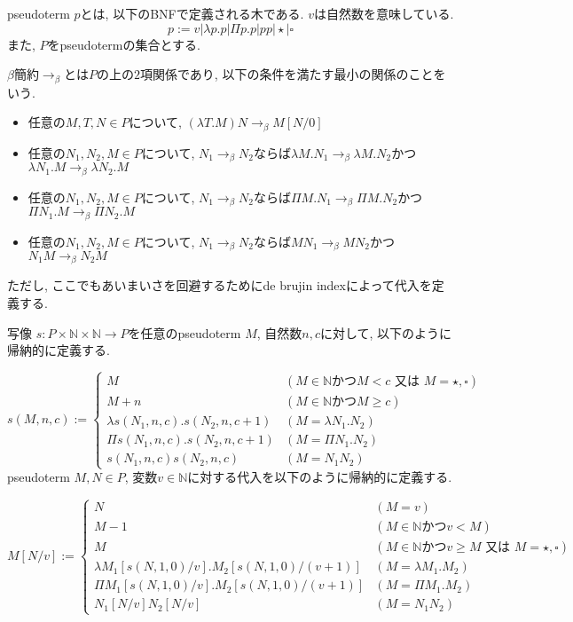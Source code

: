 \documentclass{ltjsarticle}
\begin{document}
\begin{defn}
 pseudoterm $p$とは, 以下のBNFで定義される木である. $v$は自然数を意味している.
 \[
 p := v | \lambda p. p | \Pi p. p | p p | \star | \square
 \]
 また, $P$をpseudotermの集合とする.
\end{defn}

\begin{defn}
 $\beta$簡約$\rightarrow_{\beta}$とは$P$の上の$2$項関係であり, 以下の条件を満たす最小の関係のことをいう.
 \begin{itemize}
  \item 任意の$M, T, N \in P$について, $(\lambda T. M) N \rightarrow_\beta M[N/0]$
  \item 任意の$N_1, N_2, M \in P$について, $N_1 \rightarrow_\beta N_2$ならば$\lambda M. N_1 \rightarrow_\beta \lambda M. N_2$かつ$\lambda N_1. M \rightarrow_\beta \lambda N_2. M$
  \item 任意の$N_1, N_2, M \in P$について, $N_1 \rightarrow_\beta N_2$ならば$\Pi M. N_1 \rightarrow_\beta \Pi M. N_2$かつ$\Pi N_1. M \rightarrow_\beta \Pi N_2. M$
  \item 任意の$N_1, N_2, M \in P$について, $N_1 \rightarrow_\beta N_2$ならば$M N_1 \rightarrow_\beta M N_2$かつ$N_1 M \rightarrow_\beta N_2 M$
 \end{itemize}
\end{defn}

 ただし, ここでもあいまいさを回避するためにde brujin indexによって代入を定義する.

\begin{defn}
 写像 $s \colon P \times \mathbb{N} \times \mathbb{N} \rightarrow P$を任意のpseudoterm $M$, 自然数$n, c$に対して, 以下のように帰納的に定義する.

\[
  s (M, n, c) := \begin{cases}
    M & (M \in \mathbb{N} \text{かつ} M < c \text{ 又は } M = \star, \square) \\
    M + n & (M \in \mathbb{N} \text{かつ} M \geq c) \\
    \lambda s (N_1, n, c). s (N_2, n, c + 1) & (M = \lambda N_1. N_2) \\
    \Pi s (N_1, n, c). s (N_2, n, c + 1) & (M = \Pi N_1. N_2) \\
    s (N_1, n, c) s (N_2, n, c) & (M = N_1 N_2)
  \end{cases}
\]
 pseudoterm $M, N \in P$, 変数$v \in \mathbb{N}$に対する代入を以下のように帰納的に定義する.

\[
 M[N/v] := \begin{cases}
    N & (M = v) \\
    M - 1 & (M \in \mathbb{N} \text{かつ} v < M) \\
    M & (M \in \mathbb{N} \text{かつ} v \geq M \text{ 又は } M = \star, \square) \\
    \lambda M_1 [s (N, 1, 0)/v]. M_2 [s (N, 1, 0)/(v + 1)] & (M = \lambda M_1. M_2) \\
    \Pi M_1 [s (N, 1, 0)/v]. M_2 [s (N, 1, 0)/(v + 1)] & (M = \Pi M_1. M_2) \\
    N_1[N/v] N_2[N/v] & (M = N_1 N_2)
  \end{cases}
\]
\end{defn}
\end{document}

